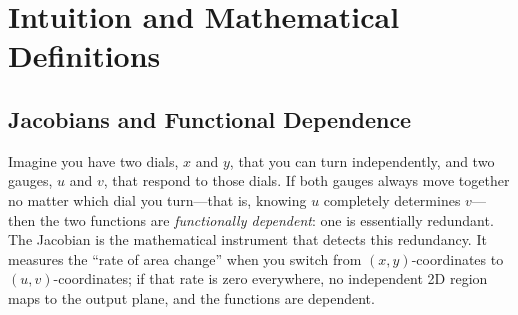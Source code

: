 \documentclass[12pt,a4paper]{article}
\begin{document}
\section{Intuition and Mathematical Definitions}

\subsection{Jacobians and Functional Dependence}

Imagine you have two dials, \( x \) and \( y \), that you can turn independently, and two gauges, \( u \) and \( v \), that respond to those dials. If both gauges always move together no matter which dial you turn---that is, knowing \( u \) completely determines \( v \)---then the two functions are \emph{functionally dependent}: one is essentially redundant. The Jacobian is the mathematical instrument that detects this redundancy. It measures the ``rate of area change'' when you switch from \((x,y)\)-coordinates to \((u,v)\)-coordinates; if that rate is zero everywhere, no independent 2D region maps to the output plane, and the functions are dependent.
\end{document}

